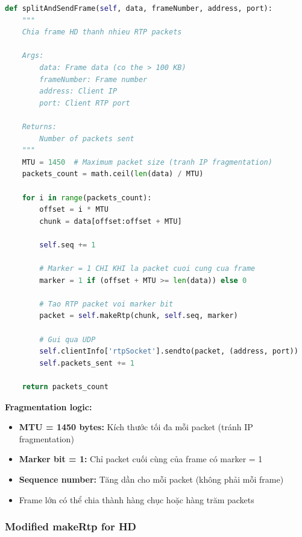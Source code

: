 \documentclass[a4paper,12pt]{article}
\begin{document}
\begin{lstlisting}[language=Python, caption={Frame Fragmentation Implementation}]
def splitAndSendFrame(self, data, frameNumber, address, port):
    """
    Chia frame HD thanh nhieu RTP packets
    
    Args:
        data: Frame data (co the > 100 KB)
        frameNumber: Frame number
        address: Client IP
        port: Client RTP port
    
    Returns:
        Number of packets sent
    """
    MTU = 1450  # Maximum packet size (tranh IP fragmentation)
    packets_count = math.ceil(len(data) / MTU)
    
    for i in range(packets_count):
        offset = i * MTU
        chunk = data[offset:offset + MTU]
        
        self.seq += 1
        
        # Marker = 1 CHI KHI la packet cuoi cung cua frame
        marker = 1 if (offset + MTU >= len(data)) else 0
        
        # Tao RTP packet voi marker bit
        packet = self.makeRtp(chunk, self.seq, marker)
        
        # Gui qua UDP
        self.clientInfo['rtpSocket'].sendto(packet, (address, port))
        self.packets_sent += 1
    
    return packets_count
\end{lstlisting}

\textbf{Fragmentation logic:}
\begin{itemize}
    \item \textbf{MTU = 1450 bytes:} Kích thước tối đa mỗi packet (tránh IP fragmentation)
    \item \textbf{Marker bit = 1:} Chỉ packet cuối cùng của frame có marker = 1
    \item \textbf{Sequence number:} Tăng dần cho mỗi packet (không phải mỗi frame)
    \item Frame lớn có thể chia thành hàng chục hoặc hàng trăm packets
\end{itemize}

\subsubsection{Modified makeRtp for HD}
\end{document}
